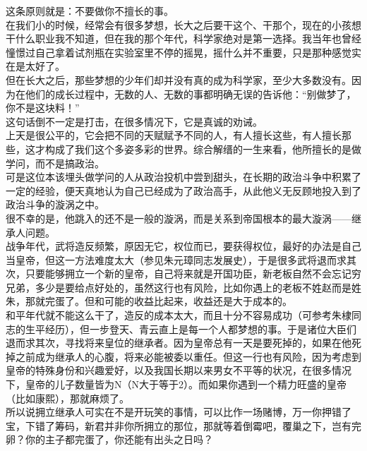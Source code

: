 \begin{multicols}{\theparacolNo}
这条原则就是：不要做你不擅长的事。\\

在我们小的时候，经常会有很多梦想，长大之后要干这个、干那个，现在的小孩想干什么职业我不知道，但在我的那个年代，科学家绝对是第一选择。我当年也曾经憧憬过自己拿着试剂瓶在实验室里不停的摇晃，摇什么并不重要，只是那种感觉实在是太好了。\\

但在长大之后，那些梦想的少年们却并没有真的成为科学家，至少大多数没有。因为在他们的成长过程中，无数的人、无数的事都明确无误的告诉他：“别做梦了，你不是这块料！”\\

这句话倒不一定是打击，在很多情况下，它是真诚的劝诫。\\

上天是很公平的，它会把不同的天赋赋予不同的人，有人擅长这些，有人擅长那些，这才构成了我们这个多姿多彩的世界。综合解缙的一生来看，他所擅长的是做学问，而不是搞政治。\\

可是这位本该埋头做学问的人从政治投机中尝到甜头，在长期的政治斗争中积累了一定的经验，便天真地认为自己已经成为了政治高手，从此他义无反顾地投入到了政治斗争的漩涡之中。\\

很不幸的是，他跳入的还不是一般的漩涡，而是关系到帝国根本的最大漩涡——继承人问题。\\

战争年代，武将造反频繁，原因无它，权位而已，要获得权位，最好的办法是自己当皇帝，但这一方法难度太大（参见朱元璋同志发展史），于是很多武将退而求其次，只要能够拥立一个新的皇帝，自己将来就是开国功臣，新老板自然不会忘记穷兄弟，多少是要给点好处的，虽然这行也有风险，比如你遇上的老板不姓赵而是姓朱，那就完蛋了。但和可能的收益比起来，收益还是大于成本的。\\

和平年代就不能这么干了，造反的成本太大，而且十分不容易成功（可参考朱棣同志的生平经历），但一步登天、青云直上是每一个人都梦想的事。于是诸位大臣们退而求其次，寻找将来皇位的继承者。因为皇帝总有一天是要死掉的，如果在他死掉之前成为继承人的心腹，将来必能被委以重任。但这一行也有风险，因为考虑到皇帝的特殊身份和兴趣爱好，以及我国长期以来男女不平等的状况，在很多情况下，皇帝的儿子数量皆为N（N大于等于2）。而如果你遇到一个精力旺盛的皇帝（比如康熙），那就麻烦了。\\

所以说拥立继承人可实在不是开玩笑的事情，可以比作一场赌博，万一你押错了宝，下错了筹码，新君并非你所拥立的那位，那就等着倒霉吧，覆巢之下，岂有完卵？你的主子都完蛋了，你还能有出头之日吗？\\


\end{multicols}

